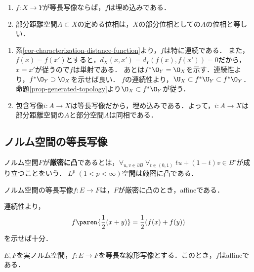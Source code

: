 \documentclass[uplatex,dvipdfmx]{jsreport}
\begin{document}
\begin{proposition}\label{prop-部分距離空間のwell-definedness}\mbox{}
    \begin{enumerate}
        \item $f:X\to Y$が等長写像ならば，$f$は埋め込みである．
        \item 部分距離空間$A\subset X$の定める位相は，$X$の部分位相としての$A$の位相と等しい．
    \end{enumerate}
\end{proposition}
\begin{Proof}\mbox{}
    \begin{enumerate}
        \item 系\ref{cor-characterization-distance-function}より，$f$は特に連続である．
        また，$f(x)=f(x')$とすると，$d_X(x,x')=d_Y(f(x),f(x'))=0$だから，$x=x'$が従うので$f$は単射である．
        あとは$f^*\O_Y=\O_X$を示す．連続性より，$f^*\O_Y\supset\O_X$を示せば良い．
        $f$の連続性より，$\U_X\subset f^*\U_Y\subset f^*\O_Y$．命題\ref{prop-generated-topology}より$\O_X\subset f^*\O_Y$が従う．
        \item 包含写像$i:A\to X$は等長写像だから，埋め込みである．よって，$i:A\to X$は部分距離空間の$A$と部分空間$A$は同相である．
    \end{enumerate}
\end{Proof}

\subsection{ノルム空間の等長写像}

\begin{definition}
    ノルム空間$F$が\textbf{厳密に凸}であるとは，$\forall_{u,v\in\partial B}\;\forall_{t\in(0,1)}\;tu+(1-t)v\in B^\circ$が成り立つことをいう．
    $L^p\;(1<p<\infty)$空間は厳密に凸である．
\end{definition}

\begin{theorem}
    ノルム空間の等長写像$f:E\to F$は，$F$が厳密に凸のとき，affineである．
\end{theorem}
\begin{Proof}
    連続性より，
    \[f\paren{\frac{1}{2}(x+y)}=\frac{1}{2}(f(x)+f(y))\]
    を示せば十分．
\end{Proof}

\begin{theorem}
    $E,F$を実ノルム空間，$f:E\to F$を等長な線形写像とする．このとき，$f$はaffineである．
\end{theorem}
\end{document}
